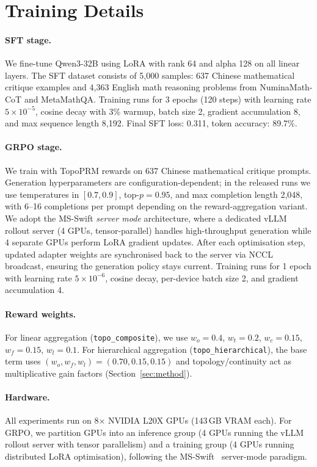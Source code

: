 \section{Training Details}
\label{app:details}

\paragraph{SFT stage.}
We fine-tune Qwen3-32B using LoRA with rank 64 and alpha 128 on all
linear layers. The SFT dataset consists of 5{,}000 samples: 637 Chinese
mathematical critique examples and 4{,}363 English math reasoning problems
from NuminaMath-CoT and MetaMathQA. Training runs for 3 epochs (120
steps) with learning rate $5 \times 10^{-5}$, cosine decay with 3\%
warmup, batch size 2, gradient accumulation 8, and max sequence length
8{,}192. Final SFT loss: 0.311, token accuracy: 89.7\%.

\paragraph{GRPO stage.}
We train with TopoPRM rewards on 637 Chinese mathematical critique
prompts. Generation hyperparameters are configuration-dependent; in the
released runs we use temperatures in $[0.7, 0.9]$, top-$p=0.95$, and
max completion length 2{,}048, with 6--16 completions per prompt
depending on the reward-aggregation variant. We adopt the
MS-Swift \emph{server mode} architecture, where a dedicated vLLM rollout
server (4 GPUs, tensor-parallel) handles high-throughput generation while
4 separate GPUs perform LoRA gradient updates. After each optimisation
step, updated adapter weights are synchronised back to the server via
NCCL broadcast, ensuring the generation policy stays current. Training
runs for 1 epoch with learning rate $5 \times 10^{-6}$, cosine decay,
per-device batch size 2, and gradient accumulation 4.

\paragraph{Reward weights.}
For linear aggregation (\texttt{topo\_composite}), we use
$w_o = 0.4$, $w_t = 0.2$, $w_c = 0.15$, $w_f = 0.15$, $w_l = 0.1$.
For hierarchical aggregation (\texttt{topo\_hierarchical}), the base term
uses $(w_o, w_f, w_l) = (0.70, 0.15, 0.15)$ and topology/continuity
act as multiplicative gain factors (Section~\ref{sec:method}).

\paragraph{Hardware.}
All experiments run on 8$\times$ NVIDIA L20X GPUs (143\,GB VRAM each).
For GRPO, we partition GPUs into an inference group (4 GPUs running the
vLLM rollout server with tensor parallelism) and a training group
(4 GPUs running distributed LoRA optimisation), following the
MS-Swift~\citep{msswift} server-mode paradigm.

